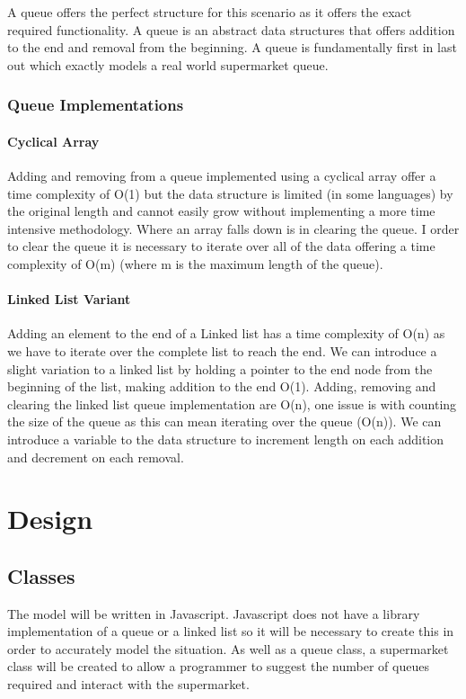 \documentclass[pdftex,a4paper,10pt,titlepage]{article}
\begin{document}
A queue offers the perfect structure for this scenario as it offers the exact required functionality. A queue is an abstract data structures that offers addition to the end and removal from the beginning. A queue is fundamentally first in last out which exactly models a real world supermarket queue.

\subsubsection{Queue Implementations}

\paragraph{Cyclical Array}

Adding and removing from a queue implemented using a cyclical array offer a time complexity of O(1) but the data structure is limited (in some languages) by the original length and cannot easily grow without implementing a more time intensive methodology. Where an array falls down is in clearing the queue. I order to clear the queue it is necessary to iterate over all of the data offering a time complexity of O(m) (where m is the maximum length of the queue).

\paragraph{Linked List Variant}

Adding an element to the end of a Linked list has a time complexity of O(n) as we have to iterate over the complete list to reach the end. We can introduce a slight variation to a linked list by holding a pointer to the end node from the beginning of the list, making addition to the end O(1).
Adding, removing and clearing the linked list queue implementation are O(n), one issue is with counting the size of the queue as this can mean iterating over the queue (O(n)). We can introduce a variable to the data structure to increment length on each addition and decrement on each removal. 

\section{Design}

\subsection{Classes}
The model will be written in Javascript. Javascript does not have a library implementation of a queue or a linked list so it will be necessary to create this in order to accurately model the situation.
As well as a queue class, a supermarket class will be created to allow a programmer to suggest the number of queues required and interact with the supermarket.
\end{document}
